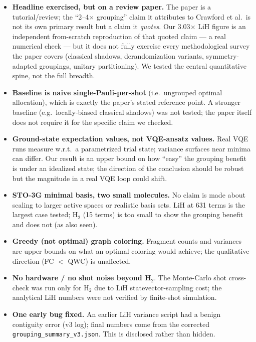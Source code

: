 \documentclass[11pt]{article}
\begin{document}
\begin{itemize}
\item \textbf{Headline exercised, but on a review paper.} The paper is a
  tutorial/review; the ``2--4$\times$ grouping'' claim it attributes to
  Crawford et al.\ is not its own primary result but a claim it \emph{quotes}.
  Our 3.03$\times$ LiH figure is an independent from-scratch reproduction of
  that quoted claim --- a real numerical check --- but it does not fully
  exercise every methodological survey the paper covers (classical shadows,
  derandomization variants, symmetry-adapted groupings, unitary partitioning).
  We tested the central quantitative spine, not the full breadth.
\item \textbf{Baseline is naive single-Pauli-per-shot} (i.e.\ ungrouped optimal
  allocation), which is exactly the paper's stated reference point.
  A stronger baseline (e.g.\ locally-biased classical shadows) was not tested;
  the paper itself does not require it for the specific claim we checked.
\item \textbf{Ground-state expectation values, not VQE-ansatz values.} Real VQE
  runs measure w.r.t.\ a parametrized trial state; variance surfaces near
  minima can differ. Our result is an upper bound on how ``easy'' the
  grouping benefit is under an idealized state; the direction of the
  conclusion should be robust but the magnitude in a real VQE loop could
  shift.
\item \textbf{STO-3G minimal basis, two small molecules.} No claim is made
  about scaling to larger active spaces or realistic basis sets. LiH at
  631 terms is the largest case tested; H$_2$ (15 terms) is too small to
  show the grouping benefit and does not (as also seen).
\item \textbf{Greedy (not optimal) graph coloring.} Fragment counts and
  variances are upper bounds on what an optimal coloring would achieve;
  the qualitative direction (FC $<$ QWC) is unaffected.
\item \textbf{No hardware / no shot noise beyond H$_2$}. The Monte-Carlo shot
  cross-check was run only for H$_2$ due to LiH statevector-sampling cost;
  the analytical LiH numbers were not verified by finite-shot simulation.
\item \textbf{One early bug fixed.} An earlier LiH variance script had a benign
  contiguity error (v3 log); final numbers come from the corrected
  \texttt{grouping\_summary\_v3.json}. This is disclosed rather than hidden.
\end{itemize}
\end{document}
